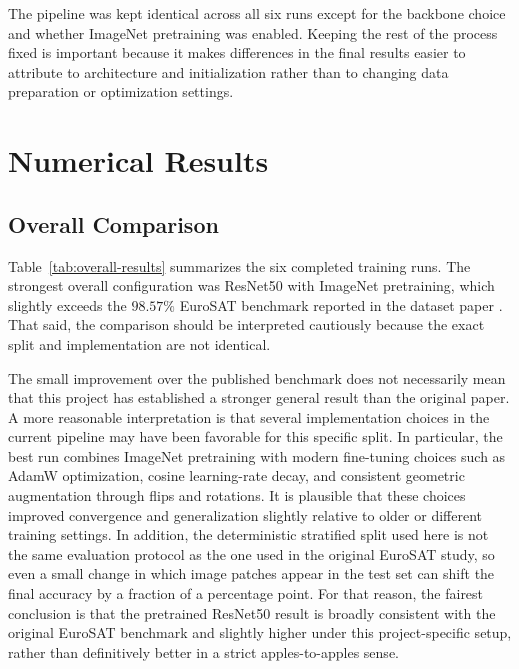 \documentclass[11pt]{report}
\newcommand{\BestModel}{ResNet50 with ImageNet pretraining}
\begin{document}
The pipeline was kept identical across all six runs except for the backbone choice and whether ImageNet pretraining was enabled. Keeping the rest of the process fixed is important because it makes differences in the final results easier to attribute to architecture and initialization rather than to changing data preparation or optimization settings.

\chapter{Numerical Results}
\section{Overall Comparison}
Table~\ref{tab:overall-results} summarizes the six completed training runs. The strongest overall configuration was \BestModel{}, which slightly exceeds the \(98.57\%\) EuroSAT benchmark reported in the dataset paper \cite{helber2019}. That said, the comparison should be interpreted cautiously because the exact split and implementation are not identical.

The small improvement over the published benchmark does not necessarily mean that this project has established a stronger general result than the original paper. A more reasonable interpretation is that several implementation choices in the current pipeline may have been favorable for this specific split. In particular, the best run combines ImageNet pretraining with modern fine-tuning choices such as AdamW optimization, cosine learning-rate decay, and consistent geometric augmentation through flips and rotations. It is plausible that these choices improved convergence and generalization slightly relative to older or different training settings. In addition, the deterministic stratified split used here is not the same evaluation protocol as the one used in the original EuroSAT study, so even a small change in which image patches appear in the test set can shift the final accuracy by a fraction of a percentage point. For that reason, the fairest conclusion is that the pretrained ResNet50 result is broadly consistent with the original EuroSAT benchmark and slightly higher under this project-specific setup, rather than definitively better in a strict apples-to-apples sense.
\end{document}
